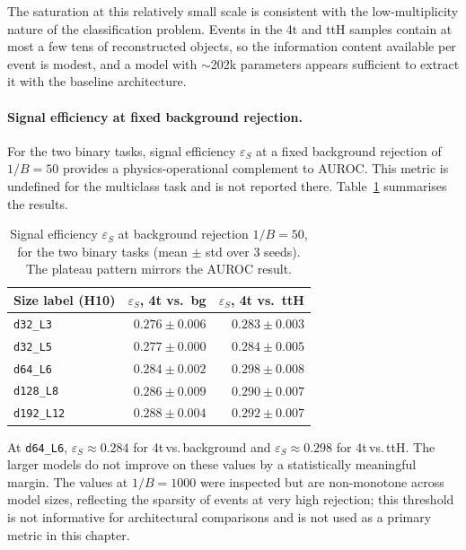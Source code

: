 The saturation at this relatively small scale is consistent with the low-multiplicity nature of the classification problem. Events in the 4t and ttH samples contain at most a few tens of reconstructed objects, so the information content available per event is modest, and a model with $\sim$202k parameters appears sufficient to extract it with the baseline architecture.

\paragraph{Signal efficiency at fixed background rejection.}

For the two binary tasks, signal efficiency $\varepsilon_S$ at a fixed background rejection of $1/B = 50$ provides a physics-operational complement to AUROC. This metric is undefined for the multiclass task and is not reported there. Table~\ref{tab:ch7_eps} summarises the results.

\begin{table}[h]
\centering\small
\caption{Signal efficiency $\varepsilon_S$ at background rejection $1/B = 50$, for the two binary tasks (mean $\pm$ std over 3 seeds). The plateau pattern mirrors the AUROC result.}
\label{tab:ch7_eps}
\begin{tabular}{lrr}
\toprule
Size label (H10) & $\varepsilon_S$, 4t vs.\ bg & $\varepsilon_S$, 4t vs.\ ttH \\
\midrule
\texttt{d32\_L3}   & $0.276 \pm 0.006$ & $0.283 \pm 0.003$ \\
\texttt{d32\_L5}   & $0.277 \pm 0.000$ & $0.284 \pm 0.005$ \\
\texttt{d64\_L6}   & $0.284 \pm 0.002$ & $0.298 \pm 0.008$ \\
\texttt{d128\_L8}  & $0.286 \pm 0.009$ & $0.290 \pm 0.007$ \\
\texttt{d192\_L12} & $0.288 \pm 0.004$ & $0.292 \pm 0.007$ \\
\bottomrule
\end{tabular}
\end{table}

At \texttt{d64\_L6}, $\varepsilon_S \approx 0.284$ for 4t\,vs.\,background and $\varepsilon_S \approx 0.298$ for 4t\,vs.\,ttH. The larger models do not improve on these values by a statistically meaningful margin. The values at $1/B = 1000$ were inspected but are non-monotone across model sizes, reflecting the sparsity of events at very high rejection; this threshold is not informative for architectural comparisons and is not used as a primary metric in this chapter.

